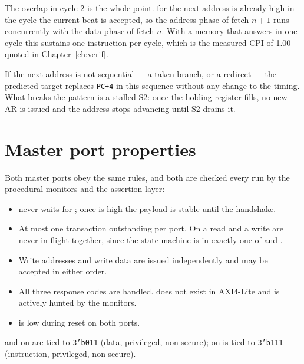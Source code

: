 The overlap in cycle 2 is the whole point.  for the next address is
already high in the cycle the current  beat is accepted, so the address
phase of fetch $n{+}1$ runs concurrently with the data phase of fetch $n$. With a
memory that answers in one cycle this sustains one instruction per cycle, which
is the measured CPI of 1.00 quoted in Chapter~\ref{ch:verif}.

If the next address is not sequential --- a taken branch, or a redirect --- the
predicted target replaces \texttt{PC+4} in this sequence without any change to
the timing. What breaks the pattern is a stalled S2: once the holding register
fills, no new AR is issued and the address stops advancing until S2 drains it.

\section{Master port properties}

Both master ports obey the same rules, and both are checked every run by the
procedural monitors and the assertion layer:

\begin{itemize}[nosep]
  \item {} never waits for ; once  is high the
        payload is stable until the handshake.
  \item At most one transaction outstanding per port. On  a read and a
        write are never in flight together, since the state machine is in exactly
        one of  and .
  \item Write addresses and write data are issued independently and may be
        accepted in either order.
  \item All three response codes are handled.  does not exist in
        AXI4-Lite and is actively hunted by the monitors.
  \item {} is low during reset on both ports.
\end{itemize}

 and  on  are tied to \texttt{3'b011} (data,
privileged, non-secure);  on  is tied to \texttt{3'b111}
(instruction, privileged, non-secure).
